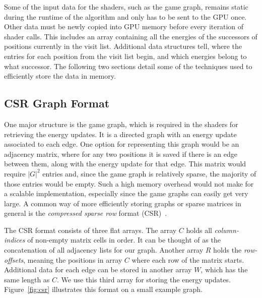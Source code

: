 Some of the input data for the shaders, such as the game graph,
remains static during the runtime of the algorithm
and only has to be sent to the GPU once.
Other data must be newly copied into GPU memory before every iteration of
shader calls.
This includes an array containing all the energies of the successors of
positions currently in the visit list.
Additional data structures tell,
where the entries for each position from the visit list begin,
and which energies belong to what successor.
The following two sections detail some of the techniques used to efficiently
store the data in memory.


\subsection{CSR Graph Format}

One major structure is the game graph,
which is required in the shaders for retrieving the energy updates.
It is a directed graph with an energy update associated to each edge.
One option for representing this graph would be an adjacency matrix,
where for any two positions it is saved if there is an edge between them,
along with the energy update for that edge.
This matrix would require $|G|^2$ entries and, since the game graph is
relatively sparse, the majority of those entries would be empty.
Such a high memory overhead would not make for a scalable implementation,
especially since the game graphs can easily get very large.
A common way of more efficiently storing graphs or sparse matrices in general is
the \emph{compressed sparse row} format (CSR)~\cite{Merrill2015,Hijma2023}.

The CSR format consists of three flat arrays.
The array $C$ holds all \emph{column-indices} of non-empty matrix cells in order.
It can be thought of as the concatenation of all adjacency lists for our graph.
Another array $R$ holds the \emph{row-offsets}, meaning the positions in array
$C$ where each row of the matrix starts.
Additional data for each edge can be stored in another array $W$, which has the
same length as $C$.
We use this third array for storing the energy updates.
Figure~\ref{fig:csr} illustrates this format on a small example graph.

